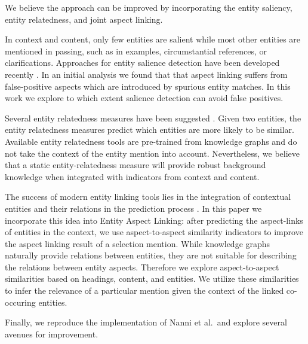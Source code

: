 We believe the approach can be improved by incorporating the entity saliency, entity relatedness, and joint aspect linking.  

In context and content, only few entities are salient while most other entities are mentioned in passing, such as in examples, circumstantial references, or clarifications. Approaches for entity salience detection have been developed  recently .   In an initial analysis we found that that aspect linking suffers from false-positive aspects which are introduced by spurious entity matches. In this work we explore to which extent salience detection can avoid false positives.


Several entity relatedness measures have been suggested \cite{ristoski2016rdf2vec} . Given two entities, the entity relatedness measures predict which entities are more likely to be similar. Available entity relatedness tools are pre-trained from knowledge graphs and do not take the context of the entity mention into account. Nevertheless, we believe that a static entity-relatedness measure will provide robust background knowledge when integrated with indicators from context and content.

The success of modern entity linking tools lies in the integration of contextual entities and their relations in the prediction process . In this paper we incorporate this idea into Entity Aspect Linking: after predicting the aspect-links of entities in the context, we use aspect-to-aspect similarity indicators to improve the aspect linking result of a selection mention. While knowledge graphs naturally provide relations between entities, they are not suitable for describing the relations between entity aspects. Therefore we explore aspect-to-aspect similarities based on headings, content, and entities. We utilize these similarities to infer the relevance of a particular mention given the context of the linked co-occuring entities.
 
Finally, we reproduce the implementation of Nanni et al.\ and explore several avenues for improvement.



